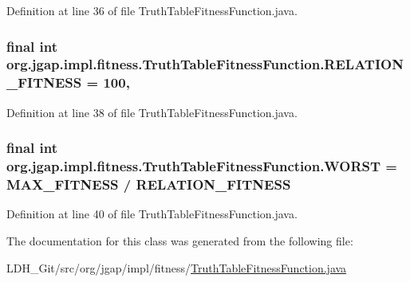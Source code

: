 Definition at line 36 of file Truth\-Table\-Fitness\-Function.\-java.

\hypertarget{classorg_1_1jgap_1_1impl_1_1fitness_1_1_truth_table_fitness_function_a596b1525fe57652af58e9589edc7ac3f}{
\subsubsection[{R\-E\-L\-A\-T\-I\-O\-N\-\_\-\-F\-I\-T\-N\-E\-S\-S}]{\setlength{\rightskip}{0pt plus 5cm}final int org.\-jgap.\-impl.\-fitness.\-Truth\-Table\-Fitness\-Function.\-R\-E\-L\-A\-T\-I\-O\-N\-\_\-\-F\-I\-T\-N\-E\-S\-S = 100\hspace{0.3cm}{\ttfamily [static]}, {\ttfamily [private]}}}\label{classorg_1_1jgap_1_1impl_1_1fitness_1_1_truth_table_fitness_function_a596b1525fe57652af58e9589edc7ac3f}


Definition at line 38 of file Truth\-Table\-Fitness\-Function.\-java.

\hypertarget{classorg_1_1jgap_1_1impl_1_1fitness_1_1_truth_table_fitness_function_a669cc63856333d085208307ea87a3185}{
\subsubsection[{W\-O\-R\-S\-T}]{\setlength{\rightskip}{0pt plus 5cm}final int org.\-jgap.\-impl.\-fitness.\-Truth\-Table\-Fitness\-Function.\-W\-O\-R\-S\-T = {\bf M\-A\-X\-\_\-\-F\-I\-T\-N\-E\-S\-S} / {\bf R\-E\-L\-A\-T\-I\-O\-N\-\_\-\-F\-I\-T\-N\-E\-S\-S}\hspace{0.3cm}{\ttfamily [static]}}}\label{classorg_1_1jgap_1_1impl_1_1fitness_1_1_truth_table_fitness_function_a669cc63856333d085208307ea87a3185}


Definition at line 40 of file Truth\-Table\-Fitness\-Function.\-java.



The documentation for this class was generated from the following file\-:\begin{DoxyCompactItemize}
\item 
L\-D\-H\-\_\-\-Git/src/org/jgap/impl/fitness/\hyperlink{_truth_table_fitness_function_8java}{Truth\-Table\-Fitness\-Function.\-java}\end{DoxyCompactItemize}

